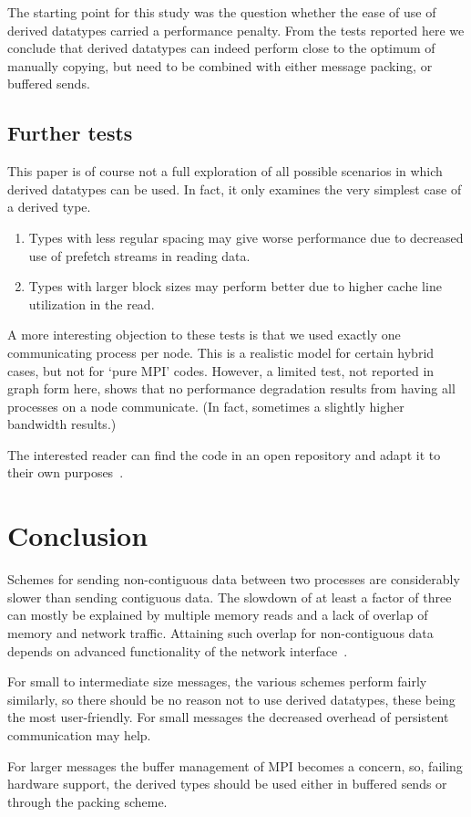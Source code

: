 The starting point for this study was the question whether
the ease of use of derived datatypes carried a performance penalty.
From the tests reported here we conclude that derived datatypes
can indeed perform close to the optimum of manually copying,
but need to be combined with either message packing,
or buffered sends.

\subsection{Further tests}

This paper is of course not a full exploration of all possible
scenarios in which derived datatypes can be used. In fact, it only
examines the very simplest case of a derived type.
\begin{enumerate}
\item Types with less regular spacing may give worse performance due
  to decreased use of prefetch streams in reading data.
\item Types with larger block sizes may perform better due to higher
  cache line utilization in the read.
\end{enumerate}
A more interesting objection to these tests is that we used exactly
one communicating process per node. This is a realistic model for
certain hybrid cases, but not for `pure MPI' codes. However, a limited
test, not reported in graph form here, shows that no performance
degradation results from having all processes on a node
communicate. (In fact, sometimes a slightly higher bandwidth results.)

The interested reader can find the code in an open repository and
adapt it to their own purposes~\cite{packingrepo}.

\section{Conclusion}
\label{sec:conclusion}

Schemes for sending non-contiguous data between two processes are
considerably slower than sending contiguous data. The slowdown of at
least a factor of three can mostly be explained by multiple memory
reads and a lack of overlap of memory and network traffic.
Attaining such overlap for non-contiguous data depends on advanced
functionality of the network interface~\cite{Hashmi:mpitype-ipdps19,LI:MpiDataUMR}.

For small to intermediate size messages, the various schemes
perform fairly similarly, so there should be no reason not to use
derived datatypes, these being the most user-friendly.
For small messages the decreased overhead of persistent communication
may help.

For larger messages the buffer management of MPI becomes a concern,
so, failing hardware support,
the derived types should be used either in buffered sends
or through the packing scheme.
